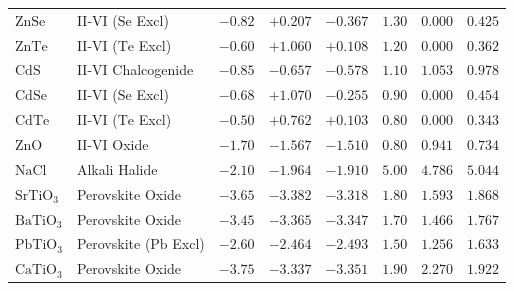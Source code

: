 \documentclass[preprint,12pt]{elsarticle}
\begin{document}
\begin{table}[ht]
{\begin{tabular}{llcccccc}
$\text{ZnSe}$ & II-VI ($\text{Se}$ Excl) & $-0.82$ & $+0.207$ & $-0.367$ & $1.30$ & $0.000$ & $0.425$ \\
$\text{ZnTe}$ & II-VI ($\text{Te}$ Excl) & $-0.60$ & $+1.060$ & $+0.108$ & $1.20$ & $0.000$ & $0.362$ \\
$\text{CdS}$ & II-VI Chalcogenide & $-0.85$ & $-0.657$ & $-0.578$ & $1.10$ & $1.053$ & $0.978$ \\
$\text{CdSe}$ & II-VI ($\text{Se}$ Excl) & $-0.68$ & $+1.070$ & $-0.255$ & $0.90$ & $0.000$ & $0.454$ \\
$\text{CdTe}$ & II-VI ($\text{Te}$ Excl) & $-0.50$ & $+0.762$ & $+0.103$ & $0.80$ & $0.000$ & $0.343$ \\
$\text{ZnO}$ & II-VI Oxide & $-1.70$ & $-1.567$ & $-1.510$ & $0.80$ & $0.941$ & $0.734$ \\
$\text{NaCl}$ & Alkali Halide & $-2.10$ & $-1.964$ & $-1.910$ & $5.00$ & $4.786$ & $5.044$ \\
$\text{SrTiO}_3$ & Perovskite Oxide & $-3.65$ & $-3.382$ & $-3.318$ & $1.80$ & $1.593$ & $1.868$ \\
$\text{BaTiO}_3$ & Perovskite Oxide & $-3.45$ & $-3.365$ & $-3.347$ & $1.70$ & $1.466$ & $1.767$ \\
$\text{PbTiO}_3$ & Perovskite ($\text{Pb}$ Excl) & $-2.60$ & $-2.464$ & $-2.493$ & $1.50$ & $1.256$ & $1.633$ \\
$\text{CaTiO}_3$ & Perovskite Oxide & $-3.75$ & $-3.337$ & $-3.351$ & $1.90$ & $2.270$ & $1.922$ \\
\bottomrule
\end{tabular}%
}
\end{table}

\end{document}
